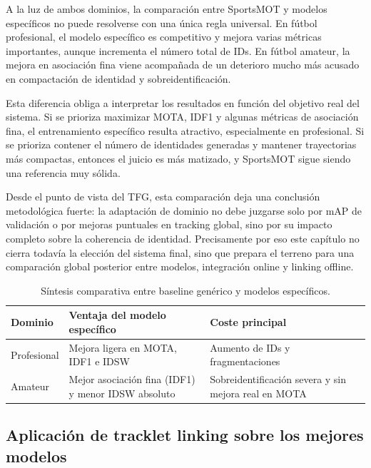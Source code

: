 \documentclass[../MAIN.tex]{subfiles}
\begin{document}
	A la luz de ambos dominios, la comparación entre SportsMOT y modelos específicos no puede resolverse con una única regla universal. En fútbol profesional, el modelo específico es competitivo y mejora varias métricas importantes, aunque incrementa el número total de IDs. En fútbol amateur, la mejora en asociación fina viene acompañada de un deterioro mucho más acusado en compactación de identidad y sobreidentificación.
	
	Esta diferencia obliga a interpretar los resultados en función del objetivo real del sistema. Si se prioriza maximizar MOTA, IDF1 y algunas métricas de asociación fina, el entrenamiento específico resulta atractivo, especialmente en profesional. Si se prioriza contener el número de identidades generadas y mantener trayectorias más compactas, entonces el juicio es más matizado, y SportsMOT sigue siendo una referencia muy sólida.
	
	Desde el punto de vista del TFG, esta comparación deja una conclusión metodológica fuerte: la adaptación de dominio no debe juzgarse solo por mAP de validación o por mejoras puntuales en tracking global, sino por su impacto completo sobre la coherencia de identidad. Precisamente por eso este capítulo no cierra todavía la elección del sistema final, sino que prepara el terreno para una comparación global posterior entre modelos, integración online y linking offline.
	
	\begin{table}[H]
		\centering
		\caption{Síntesis comparativa entre baseline genérico y modelos específicos.}
		\label{tab:cap11_sintesis}
		\begin{tabular}{p{3.2cm}p{4.7cm}p{5.2cm}}
			\toprule
			\textbf{Dominio} & \textbf{Ventaja del modelo específico} & \textbf{Coste principal} \\
			\midrule
			Profesional & Mejora ligera en MOTA, IDF1 e IDSW & Aumento de IDs y fragmentaciones \\
			Amateur & Mejor asociación fina (IDF1) y menor IDSW absoluto & Sobreidentificación severa y sin mejora real en MOTA \\
			\bottomrule
		\end{tabular}
	\end{table}
	
	\subsection{Aplicación de tracklet linking sobre los mejores modelos}
	
\end{document}
